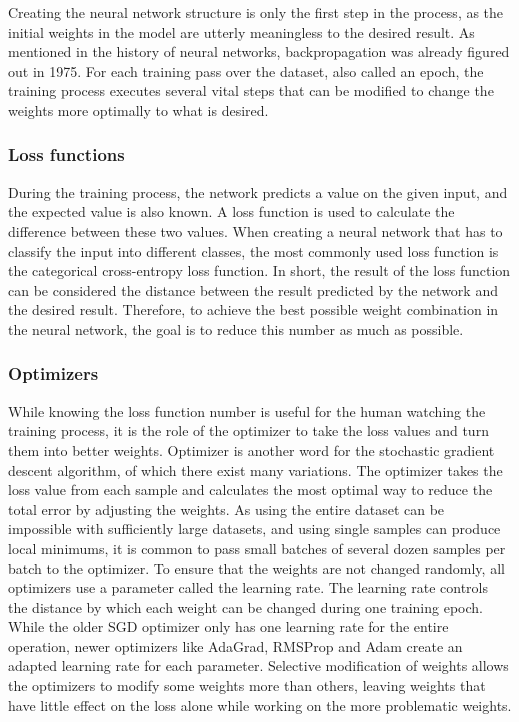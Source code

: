 Creating the neural network structure is only the first step in the process, as the initial weights in the model are utterly meaningless to the desired result.
As mentioned in the history of neural networks, backpropagation was already figured out in 1975\cite{werbos1975beyond}.
For each training pass over the dataset, also called an epoch, the training process executes several vital steps that can be modified to change the weights more optimally to what is desired.


\subsubsection{Loss functions}

During the training process, the network predicts a value on the given input, and the expected value is also known.
A loss function is used to calculate the difference between these two values.
When creating a neural network that has to classify the input into different classes, the most commonly used loss function is the categorical cross-entropy loss function\cite{wiki:crossentropy}.
In short, the result of the loss function can be considered the distance between the result predicted by the network and the desired result.
Therefore, to achieve the best possible weight combination in the neural network, the goal is to reduce this number as much as possible.

\subsubsection{Optimizers}

While knowing the loss function number is useful for the human watching the training process, it is the role of the optimizer to take the loss values and turn them into better weights.
Optimizer is another word for the stochastic gradient descent algorithm\cite{wiki:sgd}, of which there exist many variations.
The optimizer takes the loss value from each sample and calculates the most optimal way to reduce the total error by adjusting the weights.
As using the entire dataset can be impossible with sufficiently large datasets, and using single samples can produce local minimums, it is common to pass small batches of several dozen samples per batch to the optimizer.
To ensure that the weights are not changed randomly, all optimizers use a parameter called the learning rate.
The learning rate controls the distance by which each weight can be changed during one training epoch.
While the older SGD optimizer only has one learning rate for the entire operation, newer optimizers like AdaGrad, RMSProp and Adam create an adapted learning rate for each parameter. 
Selective modification of weights allows the optimizers to modify some weights more than others, leaving weights that have little effect on the loss alone while working on the more problematic weights.


